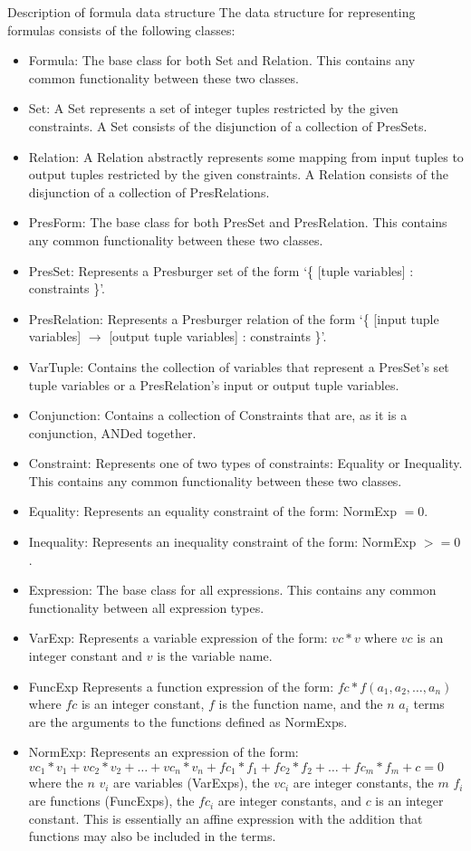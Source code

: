 \documentclass[journal,10pt]{IEEEtran}
\begin{document}
\begin{section}{Description of formula data structure}
The data structure for representing formulas consists of the following classes:

\begin{itemize}
\item Formula:
	The base class for both Set and Relation.
	This contains any common functionality between these two classes.
\item Set:
	A Set represents a set of integer tuples restricted by the given constraints.
	A Set consists of the disjunction of a collection of PresSets.
\item Relation:
	A Relation abstractly represents some mapping from input tuples to output tuples restricted by the given constraints.
	A Relation consists of the disjunction of a collection of PresRelations.
\item PresForm:
	The base class for both PresSet and PresRelation.
	This contains any common functionality between these two classes.
\item PresSet:
	Represents a Presburger set of the form `\{ [tuple variables] : constraints \}'.
\item PresRelation:
	Represents a Presburger relation of the form `\{ [input tuple variables] $\rightarrow$ [output tuple variables] : constraints \}'.
\item VarTuple:
	Contains the collection of variables that represent a PresSet's set tuple variables or a PresRelation's input or output tuple variables.
\item Conjunction:
	Contains a collection of Constraints that are, as it is a conjunction, ANDed together.
\item Constraint:
	Represents one of two types of constraints: Equality or Inequality.
	This contains any common functionality between these two classes.
\item Equality:
	Represents an equality constraint of the form: NormExp $=0$.
\item Inequality:
	Represents an inequality constraint of the form: NormExp $>=0$.
\item Expression:
	The base class for all expressions.
	This contains any common functionality between all expression types.
\item VarExp:
	Represents a variable expression of the form: $vc*v$ where $vc$ is an integer constant and $v$ is the variable name.
\item FuncExp
	Represents a function expression of the form: $fc*f(a_{1},a_{2},\ldots,a_{n})$ where $fc$ is an integer constant, $f$ is the function name, and the $n$ $a_{i}$ terms are the arguments to the functions defined as NormExps.
\item NormExp:
	Represents an expression of the form: $vc_{1}*v_{1} + vc_{2}*v_{2} + \ldots + vc_{n}*v_{n} + fc_{1}*f_{1} + fc_{2}*f_{2} + \ldots + fc_{m}*f_{m} + c = 0$ where the $n$ $v_{i}$ are variables (VarExps), the $vc_{i}$ are integer constants, the $m$ $f_{i}$ are functions (FuncExps), the $fc_{i}$ are integer constants, and $c$ is an integer constant.
	This is essentially an affine expression with the addition that functions may also be included in the terms.
\end{itemize}


\end{section}
\end{document}
